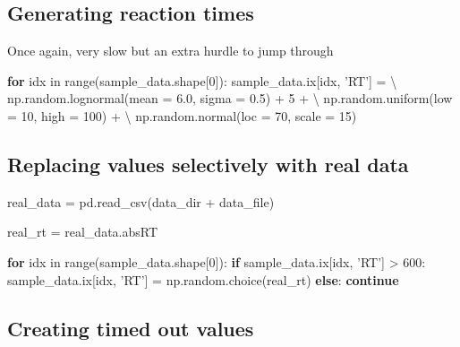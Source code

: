 \documentclass[]{article}
\newenvironment{Shaded}{\begin{snugshade}}{\end{snugshade}}
\newcommand{\KeywordTok}[1]{\textcolor[rgb]{0.13,0.29,0.53}{\textbf{{#1}}}}
\newcommand{\DataTypeTok}[1]{\textcolor[rgb]{0.13,0.29,0.53}{{#1}}}
\newcommand{\DecValTok}[1]{\textcolor[rgb]{0.00,0.00,0.81}{{#1}}}
\newcommand{\FloatTok}[1]{\textcolor[rgb]{0.00,0.00,0.81}{{#1}}}
\newcommand{\StringTok}[1]{\textcolor[rgb]{0.31,0.60,0.02}{{#1}}}
\newcommand{\NormalTok}[1]{{#1}}
\begin{document}
\subsection{Generating reaction times}\label{generating-reaction-times}

Once again, very slow but an extra hurdle to jump through

\begin{Shaded}
\begin{Highlighting}[]
\KeywordTok{for} \NormalTok{idx in }\DataTypeTok{range}\NormalTok{(sample_data.shape[}\DecValTok{0}\NormalTok{]):}
    \NormalTok{sample_data.ix[idx, }\StringTok{'RT'}\NormalTok{] = \textbackslash{}}
      \NormalTok{np.random.lognormal(mean = }\FloatTok{6.0}\NormalTok{, sigma = }\FloatTok{0.5}\NormalTok{) + }\DecValTok{5} \NormalTok{+ \textbackslash{}}
      \NormalTok{np.random.uniform(low = }\DecValTok{10}\NormalTok{, high = }\DecValTok{100}\NormalTok{) + \textbackslash{}}
      \NormalTok{np.random.normal(loc = }\DecValTok{70}\NormalTok{, scale = }\DecValTok{15}\NormalTok{)}
\end{Highlighting}
\end{Shaded}

\subsection{Replacing values selectively with real
data}\label{replacing-values-selectively-with-real-data}

\begin{Shaded}
\begin{Highlighting}[]
\NormalTok{real_data = pd.read_csv(data_dir + data_file)}

\NormalTok{real_rt = real_data.absRT}

\KeywordTok{for} \NormalTok{idx in }\DataTypeTok{range}\NormalTok{(sample_data.shape[}\DecValTok{0}\NormalTok{]):}
    \KeywordTok{if} \NormalTok{sample_data.ix[idx, }\StringTok{'RT'}\NormalTok{] > }\DecValTok{600}\NormalTok{:}
        \NormalTok{sample_data.ix[idx, }\StringTok{'RT'}\NormalTok{] = np.random.choice(real_rt)}
    \KeywordTok{else}\NormalTok{:}
        \KeywordTok{continue}
\end{Highlighting}
\end{Shaded}

\subsection{Creating timed out values}\label{creating-timed-out-values}
\end{document}
